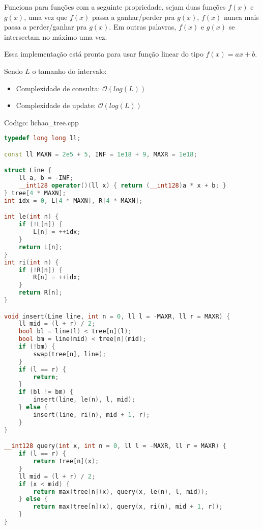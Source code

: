 \documentclass[10pt, a4paper, oneside]{book}
\begin{document}
Funciona para funções com a seguinte propriedade, sejam duas funções $f(x)$ e $g(x)$, uma vez que $f(x)$ passa a ganhar/perder pra $g(x)$, $f(x)$ nunca mais passa a perder/ganhar pra $g(x)$. Em outras palavras, $f(x)$ e $g(x)$ se intersectam no máximo uma vez.



Essa implementação está pronta para usar função linear do tipo $f(x) = ax + b$.



Sendo $L$ o tamanho do intervalo: 



\begin{itemize}
\item Complexidade de consulta: $\mathcal{O}(log(L))$
\end{itemize}



\begin{itemize}
\item Complexidade de update: $\mathcal{O}(log(L))$
\end{itemize}

\hfill

Codigo: lichao\_tree.cpp

\begin{lstlisting}[language=C++]
typedef long long ll;

const ll MAXN = 2e5 + 5, INF = 1e18 + 9, MAXR = 1e18;

struct Line {
    ll a, b = -INF;
    __int128 operator()(ll x) { return (__int128)a * x + b; }
} tree[4 * MAXN];
int idx = 0, L[4 * MAXN], R[4 * MAXN];

int le(int n) {
    if (!L[n]) {
        L[n] = ++idx;
    }
    return L[n];
}
int ri(int n) {
    if (!R[n]) {
        R[n] = ++idx;
    }
    return R[n];
}

void insert(Line line, int n = 0, ll l = -MAXR, ll r = MAXR) {
    ll mid = (l + r) / 2;
    bool bl = line(l) < tree[n](l);
    bool bm = line(mid) < tree[n](mid);
    if (!bm) {
        swap(tree[n], line);
    }
    if (l == r) {
        return;
    }
    if (bl != bm) {
        insert(line, le(n), l, mid);
    } else {
        insert(line, ri(n), mid + 1, r);
    }
}

__int128 query(int x, int n = 0, ll l = -MAXR, ll r = MAXR) {
    if (l == r) {
        return tree[n](x);
    }
    ll mid = (l + r) / 2;
    if (x < mid) {
        return max(tree[n](x), query(x, le(n), l, mid));
    } else {
        return max(tree[n](x), query(x, ri(n), mid + 1, r));
    }
}
\end{lstlisting}
\hfill
\end{document}

